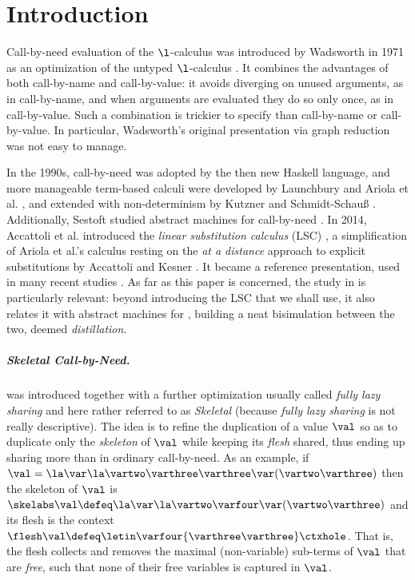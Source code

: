 

\section{Introduction}
\label{sec:introduction}
Call-by-need evaluation of the $\l$-calculus was introduced by Wadsworth in 1971 as an optimization of the untyped $\l$-calculus \cite{Wad:SemPra:71}. It combines the  advantages of both call-by-name and call-by-value: it  avoids diverging on unused arguments, as in call-by-name, and when arguments are evaluated they do so only once, as in call-by-value. Such a combination is trickier to specify than call-by-name or call-by-value. In particular, Wadsworth's original presentation via graph reduction was not easy to manage. 

In the 1990s, call-by-need was adopted by the then new Haskell language, and more manageable term-based calculi were developed by Launchbury \cite{DBLP:conf/popl/Launchbury93} and Ariola et al. \cite{DBLP:conf/popl/AriolaFMOW95}, and extended with non-determinism by Kutzner and Schmidt-Schau{\ss} \cite{DBLP:conf/icfp/KutznerS98}. 
Additionally, Sestoft studied abstract machines for call-by-need \cite{DBLP:journals/jfp/Sestoft97}. In 2014, Accattoli et al. introduced the \emph{\cbneed linear substitution calculus} (\cbneed LSC) \cite{DBLP:conf/icfp/AccattoliBM14}, a simplification of  Ariola et al.'s calculus resting on the \emph{at a distance} approach to explicit substitutions by Accattoli and Kesner \cite{DBLP:conf/csl/AccattoliK10}. It became a reference presentation, used in many recent studies \cite{DBLP:conf/fossacs/Kesner16,DBLP:journals/pacmpl/BalabonskiBBK17,DBLP:conf/ppdp/AccattoliB17,DBLP:conf/fossacs/KesnerRV18,DBLP:conf/ppdp/BarenbaumBM18,DBLP:conf/esop/AccattoliGL19,DBLP:journals/lmcs/KesnerPV24,DBLP:conf/fscd/BalabonskiLM21,DBLP:conf/csl/AccattoliL22,DBLP:conf/fscd/AccattoliL24}. As far as this paper is concerned, the study in \cite{DBLP:conf/icfp/AccattoliBM14} is particularly relevant: beyond introducing the \cbneed LSC that we shall use, it also relates it with abstract machines for \cbneed, building a neat bisimulation between the two, deemed \emph{distillation}.

\subparagraph{Skeletal Call-by-Need.} \cbneed was introduced together with a further optimization usually called \emph{fully lazy sharing} and here rather referred to as \emph{Skeletal \cbneed} (because \emph{fully lazy sharing} is not really descriptive). The idea is to refine the duplication of a value $\val$ so as to duplicate only the \emph{skeleton} of $\val$ while keeping its \emph{flesh} shared, thus ending up sharing more than in ordinary call-by-need. As an example, if $\val = \la\var\la\vartwo\varthree\varthree\var(\vartwo\varthree)$ then the skeleton of $\val$ is $\skelabs\val \defeq \la\var\la\vartwo\varfour\var(\vartwo\varthree)$ and its flesh is the context $\flesh\val \defeq \letin\varfour{\varthree\varthree}\ctxhole$. That is, the flesh collects and removes the maximal (non-variable) sub-terms of $\val$ that are \emph{free}, \ie such that none of their free variables is captured in $\val$.

